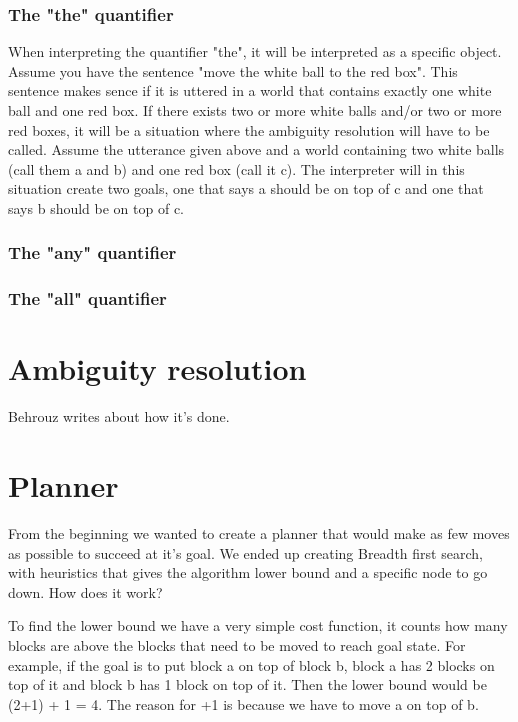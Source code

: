 \documentclass[11pt]{article}
\begin{document}
\subsubsection*{The "the" quantifier}
When interpreting the quantifier "the", it will be interpreted as a specific object. Assume you have the sentence "move the white ball to the red box". This sentence makes sence if it is uttered in a world that contains exactly one white ball and one red box. If there exists two or more white balls and/or two or more red boxes, it will be a situation where the ambiguity resolution will have to be called. Assume the utterance given above and a world containing two white balls (call them a and b) and one red box (call it c). The interpreter will in this situation create two goals, one that says a should be on top of c and one that says b should be on top of c.

\subsubsection*{The "any" quantifier}


\subsubsection*{The "all" quantifier}



\section*{Ambiguity resolution}
Behrouz writes about how it's done.

\section*{Planner}
From the beginning we wanted to create a planner that would make as few moves as possible to succeed at it's goal. We ended up creating Breadth first search, with heuristics that gives the algorithm lower bound and a specific node to go down. How does it work?

To find the lower bound we have a very simple cost function, it counts how many blocks are above the blocks that need to be moved to reach goal state. For example, if the goal is to put block a on top of block b, block a has 2 blocks on top of it and block b has 1 block on top of it. Then the lower bound would be (2+1) + 1 = 4. The reason for +1 is because we have to move a on top of b. 
\end{document}
